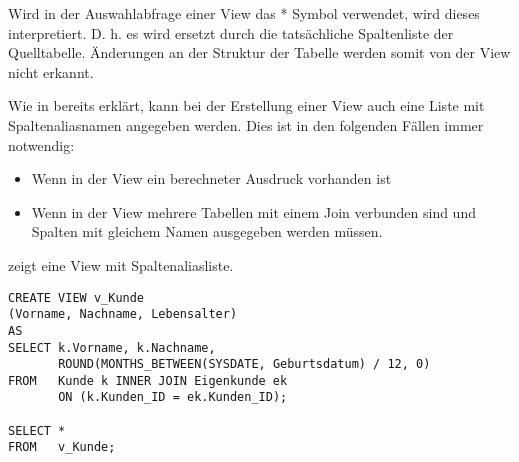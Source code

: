         \begin{merke}
          Wird in der Auswahlabfrage einer View das * Symbol verwendet, wird dieses interpretiert. D. h. es wird ersetzt durch die tatsächliche Spaltenliste der Quelltabelle. Änderungen an der Struktur der Tabelle werden somit von der View nicht erkannt.
        \end{merke}
        Wie in  bereits erklärt, kann bei der Erstellung einer View auch eine Liste mit Spaltenaliasnamen angegeben werden. Dies ist in den folgenden Fällen immer notwendig:
        \begin{itemize}
          \item Wenn in der View ein berechneter Ausdruck vorhanden ist
          \item Wenn in der View mehrere Tabellen mit einem Join verbunden sind und Spalten mit gleichem Namen ausgegeben werden müssen.
        \end{itemize}
         zeigt eine View mit Spaltenaliasliste.
\clearpage
        \begin{lstlisting}[language=oracle_sql,caption={Eine einfache View mit Spaltenaliasliste},label=sql08_29]
CREATE VIEW v_Kunde
(Vorname, Nachname, Lebensalter)
AS
SELECT k.Vorname, k.Nachname,
       ROUND(MONTHS_BETWEEN(SYSDATE, Geburtsdatum) / 12, 0)
FROM   Kunde k INNER JOIN Eigenkunde ek
       ON (k.Kunden_ID = ek.Kunden_ID);

SELECT *
FROM   v_Kunde;
        \end{lstlisting}
